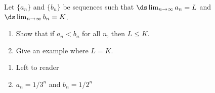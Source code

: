 {Let $\{a_n\}$ and $\{b_n\}$ be sequences such that $\ds\lim_{n\to\infty} a_n = L$ and $\ds\lim_{n\to\infty} b_n = K$. 
		\begin{enumerate}
		\item		Show that if $a_n<b_n$ for all $n$, then $L\leq K$. 
		\item		Give an example where $L = K$.
		\end{enumerate}
}
{\begin{enumerate}
\item		Left to reader
\item		$a_n = 1/3^n$ and $b_n = 1/2^n$
\end{enumerate}
}
